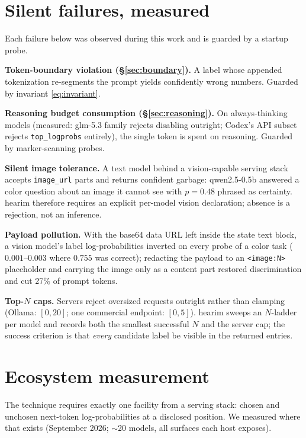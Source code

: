 \documentclass[11pt]{article}
\begin{document}
\section{Silent failures, measured}
\label{sec:failures}

Each failure below was observed during this work and is guarded by a
startup probe.

\textbf{Token-boundary violation (\S\ref{sec:boundary}).} A label whose
appended tokenization re-segments the prompt yields confidently wrong
numbers. Guarded by invariant \eqref{eq:invariant}.

\textbf{Reasoning budget consumption (\S\ref{sec:reasoning}).} On
always-thinking models (measured: glm-5.3 family rejects disabling
outright; Codex's API subset rejects \texttt{top\_logprobs} entirely), the
single token is spent on reasoning. Guarded by marker-scanning probes.

\textbf{Silent image tolerance.} A text model behind a vision-capable
serving stack accepts \texttt{image\_url} parts and returns confident
garbage: qwen2.5-0.5b answered a color question about an image it cannot
see with $p = 0.48$ phrased as certainty. hearim therefore requires an
explicit per-model vision declaration; absence is a rejection, not an
inference.

\textbf{Payload pollution.} With the base64 data URL left inside the state
text block, a vision model's label log-probabilities inverted on every
probe of a color task ($0.001$--$0.003$ where $0.755$ was correct);
redacting the payload to an \texttt{<image:N>} placeholder and carrying
the image only as a content part restored discrimination and cut 27\% of
prompt tokens.

\textbf{Top-$N$ caps.} Servers reject oversized requests outright rather
than clamping (Ollama: $[0,20]$; one commercial endpoint: $[0,5]$).
hearim sweeps an $N$-ladder per model and records both the smallest
successful $N$ and the server cap; the success criterion is that
\emph{every} candidate label be visible in the returned entries.

\section{Ecosystem measurement}
\label{sec:measure}

The technique requires exactly one facility from a serving stack: chosen
and unchosen next-token log-probabilities at a disclosed position. We
measured where that exists (September 2026; $\sim$20 models, all surfaces
each host exposes).
\end{document}
